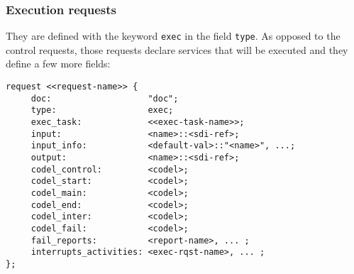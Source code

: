 \subsubsection{Execution requests}

They are defined with the keyword {\tt exec} in the field {\tt type}. As
opposed to the control requests, those requests declare services that
will be executed and they define a few more fields:

\begin{center}\begin{cartouche}\small\begin{verbatim}
request <<request-name>> {
     doc:                   "doc";
     type:                  exec;
     exec_task:             <<exec-task-name>>;
     input:                 <name>::<sdi-ref>;
     input_info:            <default-val>::"<name>", ...;
     output:                <name>::<sdi-ref>;
     codel_control:         <codel>;
     codel_start:           <codel>;
     codel_main:            <codel>;
     codel_end:             <codel>;
     codel_inter:           <codel>;
     codel_fail:            <codel>;
     fail_reports:          <report-name>, ... ;
     interrupts_activities: <exec-rqst-name>, ... ;
};
\end{verbatim}\end{cartouche}\end{center}

